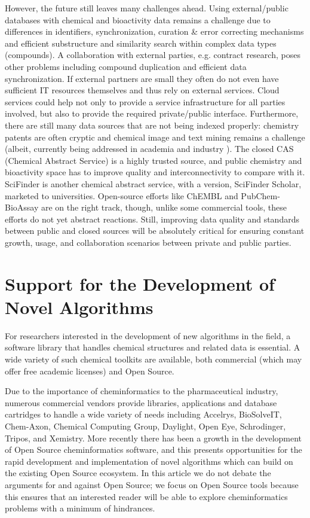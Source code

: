 \documentclass{sig-alternate}
\begin{document}
However, the future still leaves many challenges ahead. Using
external/public databases with chemical and bioactivity data remains a
challenge due to differences in identifiers, synchronization, curation
\& error correcting mechanisms and efficient substructure and
similarity search within complex data types (compounds). A
collaboration with external parties, e.g. contract research, poses
other problems including compound duplication and efficient data
synchronization. If external partners are small they often do not even
have sufficient IT resources themselves and thus rely on external
services. Cloud services could help not only to provide a service
infrastructure for all parties involved, but also to provide the
required private/public interface. Furthermore, there are still many
data sources that are not being indexed properly: chemistry patents
are often cryptic and chemical image and text mining remains a
challenge (albeit, currently being addressed in academia and industry
\cite{Jessop:2011fk,Sayle:2009uq}). The closed CAS (Chemical Abstract
Service) is a highly trusted source, and public chemistry and
bioactivity space has to improve quality and interconnectivity to
compare with it. SciFinder is another chemical abstract service, with a version, SciFinder Scholar, marketed to universities.  Open-source efforts like ChEMBL and PubChem-BioAssay are on the
right track, though, unlike some commercial tools, these efforts do not yet abstract reactions. Still, improving data quality and standards between
public and closed sources will be absolutely critical for ensuring
constant growth, usage, and collaboration scenarios between private
and public parties.

\section{Support for the Development of Novel Algorithms}
\label{sec:development-support}

For researchers interested in the development of new algorithms in the
field, a software library that handles chemical structures and related
data is essential. A wide variety of such chemical toolkits are
available, both commercial (which may offer free academic
licenses) and Open Source.

Due to the importance of cheminformatics to the pharmaceutical
industry, numerous commercial vendors provide libraries,
applications and database cartridges to handle a wide variety of
needs including Accelrys, BioSolveIT, Chem-Axon, Chemical Computing Group,
Daylight, Open Eye, Schrodinger, Tripos, and Xemistry. More recently
there has been a growth in the development of Open
Source cheminformatics software, and this presents opportunities for
the rapid development and implementation of novel algorithms which can
build on the existing Open Source ecosystem. In this article we do not debate the
arguments for and against Open Source; we focus on Open Source
tools because this ensures that an interested reader will be able to explore
cheminformatics problems with a minimum of hindrances.
\end{document}
